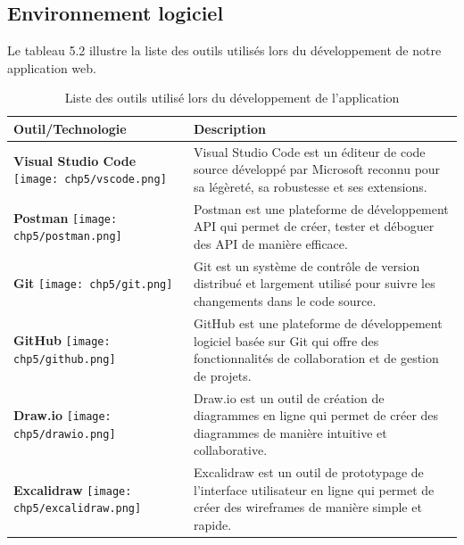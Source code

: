 \subsection{Environnement logiciel}
Le tableau 5.2 illustre la liste des outils utilisés lors du développement de notre application web. \newpage
\begin{longtable}{|p{4cm}|p{11cm}|}
    \caption{Liste des outils utilisé lors du développement de l’application} \\
    \hline
        \textbf{Outil/Technologie} & \textbf{Description} \\
    \hline
    \centering \textbf{Visual Studio Code} \vspace{0.2cm} \newline \centering \texttt{[image: chp5/vscode.png]} & Visual Studio Code est un éditeur de code source développé par Microsoft reconnu pour sa légèreté, sa robustesse et ses extensions. \\
    \hline
    \centering \textbf{Postman} \vspace{0.2cm} \newline \centering \texttt{[image: chp5/postman.png]} & Postman est une plateforme de développement API qui permet de créer, tester et déboguer des API de manière efficace. \\
    \hline
    \centering \textbf{Git} \vspace{0.2cm} \newline \centering \texttt{[image: chp5/git.png]} & Git est un système de contrôle de version distribué et largement utilisé pour suivre les changements dans le code source. \\
    \hline
    \centering \textbf{GitHub} \vspace{0.2cm} \newline \centering \texttt{[image: chp5/github.png]} & GitHub est une plateforme de développement logiciel basée sur Git qui offre des fonctionnalités de collaboration et de gestion de projets. \\
    \hline
    \centering \textbf{Draw.io} \vspace{0.2cm} \newline \centering \texttt{[image: chp5/drawio.png]} & Draw.io est un outil de création de diagrammes en ligne qui permet de créer des diagrammes de manière intuitive et collaborative. \\
    \hline
    \centering \textbf{Excalidraw} \vspace{0.2cm} \newline \centering \texttt{[image: chp5/excalidraw.png]} & Excalidraw est un outil de prototypage de l'interface utilisateur en ligne qui permet de créer des wireframes de manière simple et rapide. \\

\end{longtable}
